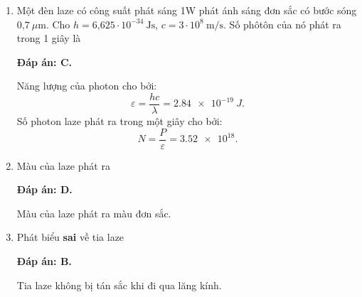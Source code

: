 \begin{enumerate}[label=\bfseries Câu \arabic*:]
\item {} 
		\cauhoi
	{Một đèn laze có công suất phát sáng 1W phát ánh sáng đơn sắc có bước sóng $\text{0,7}\ \mu\text{m}$. Cho $h = \text{6,625}\cdot 10^{-34}\ \text{Js}$, $c = 3\cdot 10^8\ \text{m/s}$. Số phôtôn của nó phát ra trong 1 giây là
	}
	
	\loigiai
	{		\textbf{Đáp án: C.}

Năng lượng của photon cho bởi:
$$
	\varepsilon = \dfrac{hc}{\lambda} = \SI{2,84 e-19}{J}.
$$		
Số photon laze phát ra trong một giây cho bởi:
$$
	N = \dfrac{P}{\varepsilon} = \num{3,52 e18}.
$$
		
	}
	
	\item {} 
	\cauhoi
	{Màu của laze phát ra
	}
	
	\loigiai
	{		\textbf{Đáp án: D.}
		
Màu của laze phát ra màu đơn sắc.
		
	}
	
	\item {}
	\cauhoi
	{Phát biểu \textbf{sai} về tia laze
	}
	
	\loigiai
	{		\textbf{Đáp án: B.}
		
Tia laze không bị tán sắc khi đi qua lăng kính.
		
	}
		

\end{enumerate}

